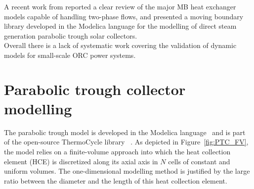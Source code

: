 \documentclass[final,3p,times,review]{elsarticle}
\begin{document}
A recent work from \cite{Bonilla_MB_2015} reported a clear review of the major MB heat exchanger models capable of handling two-phase flows, and presented a moving boundary library developed in the Modelica language for the modelling of direct steam generation parabolic trough solar collectors.\\
Overall there is a lack of systematic work covering the validation of dynamic models for small-scale ORC power systems.
%


\section{Parabolic trough collector modelling}
\label{Sec:DynModel}

The parabolic trough model is developed in the Modelica language~\cite{Elmqvist199} and is part of the open-source ThermoCycle library ~\cite{Quoilin2014a}. As depicted in Figure~\ref{fig:PTC_FV}, the model relies on a finite-volume approach into which the heat collection element (HCE) is discretized along its axial axis in $N$ cells of constant and uniform volumes. The one-dimensional modelling method is justified by the large ratio between the diameter and the length of this heat collection element. 
%
\end{document}
